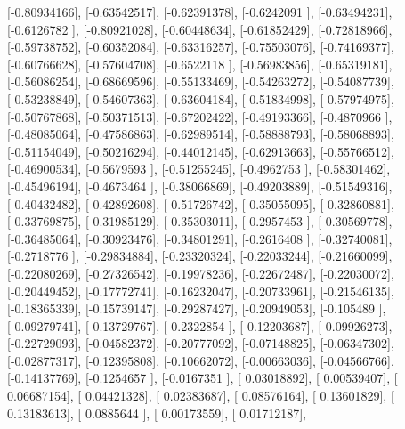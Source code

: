 \documentclass{article}
\begin{document}
       [-0.80934166],
       [-0.63542517],
       [-0.62391378],
       [-0.6242091 ],
       [-0.63494231],
       [-0.6126782 ],
       [-0.80921028],
       [-0.60448634],
       [-0.61852429],
       [-0.72818966],
       [-0.59738752],
       [-0.60352084],
       [-0.63316257],
       [-0.75503076],
       [-0.74169377],
       [-0.60766628],
       [-0.57604708],
       [-0.6522118 ],
       [-0.56983856],
       [-0.65319181],
       [-0.56086254],
       [-0.68669596],
       [-0.55133469],
       [-0.54263272],
       [-0.54087739],
       [-0.53238849],
       [-0.54607363],
       [-0.63604184],
       [-0.51834998],
       [-0.57974975],
       [-0.50767868],
       [-0.50371513],
       [-0.67202422],
       [-0.49193366],
       [-0.4870966 ],
       [-0.48085064],
       [-0.47586863],
       [-0.62989514],
       [-0.58888793],
       [-0.58068893],
       [-0.51154049],
       [-0.50216294],
       [-0.44012145],
       [-0.62913663],
       [-0.55766512],
       [-0.46900534],
       [-0.5679593 ],
       [-0.51255245],
       [-0.4962753 ],
       [-0.58301462],
       [-0.45496194],
       [-0.4673464 ],
       [-0.38066869],
       [-0.49203889],
       [-0.51549316],
       [-0.40432482],
       [-0.42892608],
       [-0.51726742],
       [-0.35055095],
       [-0.32860881],
       [-0.33769875],
       [-0.31985129],
       [-0.35303011],
       [-0.2957453 ],
       [-0.30569778],
       [-0.36485064],
       [-0.30923476],
       [-0.34801291],
       [-0.2616408 ],
       [-0.32740081],
       [-0.2718776 ],
       [-0.29834884],
       [-0.23320324],
       [-0.22033244],
       [-0.21660099],
       [-0.22080269],
       [-0.27326542],
       [-0.19978236],
       [-0.22672487],
       [-0.22030072],
       [-0.20449452],
       [-0.17772741],
       [-0.16232047],
       [-0.20733961],
       [-0.21546135],
       [-0.18365339],
       [-0.15739147],
       [-0.29287427],
       [-0.20949053],
       [-0.105489  ],
       [-0.09279741],
       [-0.13729767],
       [-0.2322854 ],
       [-0.12203687],
       [-0.09926273],
       [-0.22729093],
       [-0.04582372],
       [-0.20777092],
       [-0.07148825],
       [-0.06347302],
       [-0.02877317],
       [-0.12395808],
       [-0.10662072],
       [-0.00663036],
       [-0.04566766],
       [-0.14137769],
       [-0.1254657 ],
       [-0.0167351 ],
       [ 0.03018892],
       [ 0.00539407],
       [ 0.06687154],
       [ 0.04421328],
       [ 0.02383687],
       [ 0.08576164],
       [ 0.13601829],
       [ 0.13183613],
       [ 0.0885644 ],
       [ 0.00173559],
       [ 0.01712187],
\end{document}
